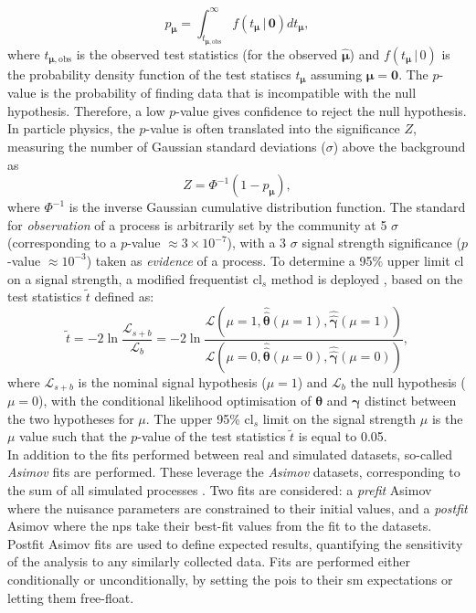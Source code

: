 \begin{equation}
    p_{\boldsymbol{\mu}}=\int_{t_{\boldsymbol{\mu},\mathrm{obs}}}^{\infty} f(t_{\boldsymbol{\mu}} \,| \, \boldsymbol{0}) dt_{\boldsymbol{\mu}},
\end{equation}
where $t_{\boldsymbol{\mu},\mathrm{obs}}$ is the observed test statistics (for the observed $\hat{\boldsymbol{\mu}}$) and $f(t_{\boldsymbol{\mu}} \,| \,0)$ is the probability density function of the test statiscs $t_{\boldsymbol{\mu}}$ assuming $\boldsymbol{\mu} = \boldsymbol{0}$. The $p$-value is the probability of finding data that is incompatible with the null hypothesis. Therefore, a low $p$-value gives confidence to reject the null hypothesis. In particle physics, the $p$-value is often translated into the significance $Z$, measuring the number of Gaussian standard deviations ($\sigma$) above the background as
\begin{equation}
    Z = \Phi^{-1}(1-p_{\boldsymbol{\mu}}),
\end{equation}
where $\Phi^{-1}$ is the inverse Gaussian cumulative distribution function. The standard for \textit{observation} of a process is arbitrarily set by the community at 5 $\sigma$ (corresponding to a $p$-value $\approx 3 \times 10^{-7}$), with a 3 $\sigma$ signal strength significance ($p$-value $\approx 10^{-3}$) taken as \textit{evidence} of a process. To determine a 95\% upper limit \gls{cl} on a signal strength, a modified frequentist \gls{cl}$_s$ method is deployed \cite{asympForm, ALRead_2002}, based on the test statistics $\tilde{t}$ defined as:
\begin{equation}
    \tilde{t} = -2 \ln \frac{\mathcal{L}_{s+b}}{\mathcal{L}_{b}} = -2 \ln \frac{\mathcal{L}\left(\mu = 1, \hat{\hat{\boldsymbol{\theta}}}(\mu = 1), \hat{\hat{\boldsymbol{\gamma}}}(\mu = 1) \right)}{\mathcal{L}\left(\mu = 0, \hat{\hat{\boldsymbol{\theta}}}(\mu = 0), \hat{\hat{\boldsymbol{\gamma}}}(\mu = 0) \right)},
\end{equation}
where $\mathcal{L}_{s+b}$ is the nominal signal hypothesis ($\mu = 1$) and $\mathcal{L}_{b}$ the null hypothesis ($\mu = 0$), with the conditional likelihood optimisation of $\boldsymbol{\theta}$ and $\boldsymbol{\gamma}$ distinct between the two hypotheses for $\mu$. The upper 95\% \gls{cl}$_s$ limit on the signal strength $\mu$ is the $\mu$ value such that the $p$-value of the test statistics $\tilde{t}$ is equal to 0.05.\\

In addition to the fits performed between real and simulated datasets, so-called \textit{Asimov} fits are performed. These leverage the \textit{Asimov} datasets, corresponding to the sum of all simulated processes \cite{asympForm}. Two fits are considered: a \textit{prefit} Asimov where the nuisance parameters are constrained to their initial values, and a \textit{postfit} Asimov where the \glspl{np} take their best-fit values from the fit to the datasets. Postfit Asimov fits are used to define expected results, quantifying the sensitivity of the analysis to any similarly collected data. Fits are performed either conditionally or unconditionally, by setting the \glspl{poi} to their \gls{sm} expectations or letting them free-float. 

